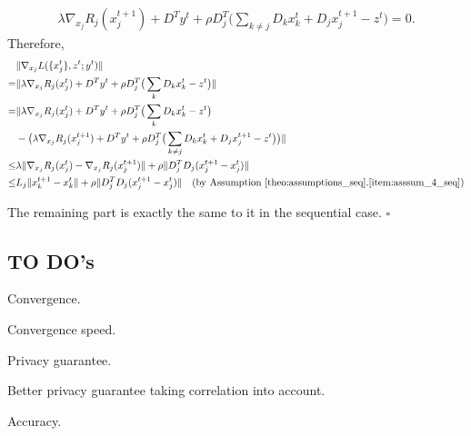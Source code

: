 \begin{align}
    \lambda\nabla_{x_j}R_j(x_j^{t+1}) + D^Ty^t + \rho D_j^T\big(\sum_{k\not=j} D_kx_k^{t}+ D_jx_j^{t+1} - z^{t}\big) = 0.
\end{align}
Therefore,
\begin{align}
    & \|\nabla_{x_j} L(\{x^t_j\}, z^t; y^t)\|\nonumber\\
    = & \|\lambda\nabla_{x_j}R_j(x_j^{t}) + D^Ty^t + \rho D_j^T\big( \sum_{k} D_kx_k^{t} - z^{t}\big)\|\nonumber\\
    = &  \|\lambda\nabla_{x_j}R_j(x_j^{t}) + D^Ty^t + \rho D_j^T\big( \sum_{k} D_kx_k^{t} - z^{t}\big)\nonumber\\
     & - \big(\lambda\nabla_{x_j}R_j(x_j^{t+1}) + D^Ty^t + \rho D_j^T\big(\sum_{k\not=j} D_kx_k^{t}+ D_jx_j^{t+1} - z^{t}\big)\big)\|\nonumber\\
    \le &  \lambda\|\nabla_{x_j}R_j(x_j^{t}) - \nabla_{x_j}R_j(x_j^{t+1}) \| + \rho\|D_j^TD_j(x_j^{t+1} - x_j^t)\|\nonumber\\
    \le & L_j\| x_k^{t+1} - x_k^t \|  + \rho\|D_j^TD_j(x_j^{t+1} - x_j^t)\| \quad\text{(by Assumption~\ref{theo:assumptions_seq}.\ref{item:asssum_4_seq})}\label{eq:proof_pal_bound_V_2}
\end{align}

The remaining part is exactly the same to it in the sequential case. \hfill$\square$

\subsection{TO DO's}
Convergence.

Convergence speed.

Privacy guarantee.

Better privacy guarantee taking correlation into account.

Accuracy.

